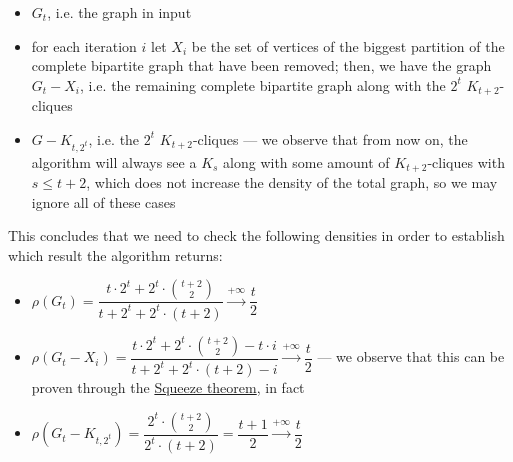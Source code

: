 \documentclass[a4paper, 12pt]{report}
\begin{document}
{        \begin{itemize}
            \item $G_t$, i.e. the graph in input
            \item for each iteration $i$ let $X_i$ be the set of vertices of the biggest partition of the complete bipartite graph that have been removed; then, we have the graph $G_t - X_i$, i.e. the remaining complete bipartite graph along with the $2^t$ $K_{t + 2}$-cliques
            \item $G - K_{t, 2^t}$, i.e. the $2^t$ $K_{t + 2}$-cliques --- we observe that from now on, the algorithm will always see a $K_s$ along with some amount of $K_{t + 2}$-cliques with $s \le t + 2$, which does not increase the density of the total graph, so we may ignore all of these cases
        \end{itemize}

        This concludes that we need to check the following densities in order to establish which result the algorithm returns:

        \begin{itemize}
            \item $\rho(G_t)=\dfrac{t \cdot 2^t + 2^t \cdot \binom{t + 2}{2}}{t + 2^t + 2^t \cdot (t + 2)} \stackrel{+ \infty}{\longrightarrow} \dfrac{t}{2}$
            \item $\rho(G_t - X_i) = \dfrac{t \cdot 2^t + 2 ^ t \cdot \binom{t+ 2}{2} - t \cdot i}{ t + 2^t + 2^t \cdot (t + 2) - i} \stackrel{+ \infty}{\longrightarrow} \dfrac{t}{2}$ --- we observe that this can be proven through the \href{https://en.wikipedia.org/wiki/Squeeze_theorem}{Squeeze theorem}, in fact 
            \item $\rho(G_t - K_{t, 2^t}) = \dfrac{2^t \cdot \binom{t + 2}{2}}{2^t \cdot (t + 2)} = \dfrac{t + 1}{2} \stackrel{+ \infty}{\longrightarrow} \dfrac{t}{2}$
        \end{itemize}

}
\end{document}
